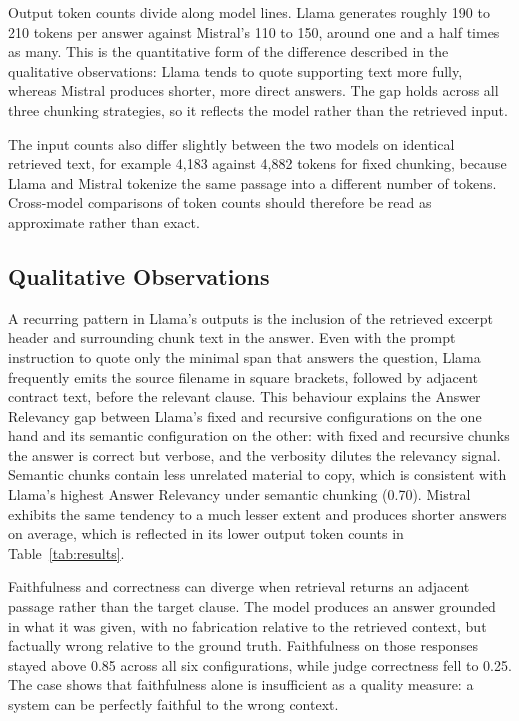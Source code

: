 Output token counts divide along model lines. Llama generates roughly 190 to 210 tokens per answer against Mistral's 110 to 150, around one and a half times as many. This is the quantitative form of the difference described in the qualitative observations: Llama tends to quote supporting text more fully, whereas Mistral produces shorter, more direct answers. The gap holds across all three chunking strategies, so it reflects the model rather than the retrieved input.

The input counts also differ slightly between the two models on identical retrieved text, for example 4{,}183 against 4{,}882 tokens for fixed chunking, because Llama and Mistral tokenize the same passage into a different number of tokens. Cross-model comparisons of token counts should therefore be read as approximate rather than exact.

\subsection{Qualitative Observations}

A recurring pattern in Llama's outputs is the inclusion of the retrieved excerpt header and surrounding chunk text in the answer. Even with the prompt instruction to quote only the minimal span that answers the question, Llama frequently emits the source filename in square brackets, followed by adjacent contract text, before the relevant clause. This behaviour explains the Answer Relevancy gap between Llama's fixed and recursive configurations on the one hand and its semantic configuration on the other: with fixed and recursive chunks the answer is correct but verbose, and the verbosity dilutes the relevancy signal. Semantic chunks contain less unrelated material to copy, which is consistent with Llama's highest Answer Relevancy under semantic chunking (0.70). Mistral exhibits the same tendency to a much lesser extent and produces shorter answers on average, which is reflected in its lower output token counts in Table~\ref{tab:results}.

Faithfulness and correctness can diverge when retrieval returns an adjacent passage rather than the target clause. The model produces an answer grounded in what it was given, with no fabrication relative to the retrieved context, but factually wrong relative to the ground truth. Faithfulness on those responses stayed above 0.85 across all six configurations, while judge correctness fell to 0.25. The case shows that faithfulness alone is insufficient as a quality measure: a system can be perfectly faithful to the wrong context.

